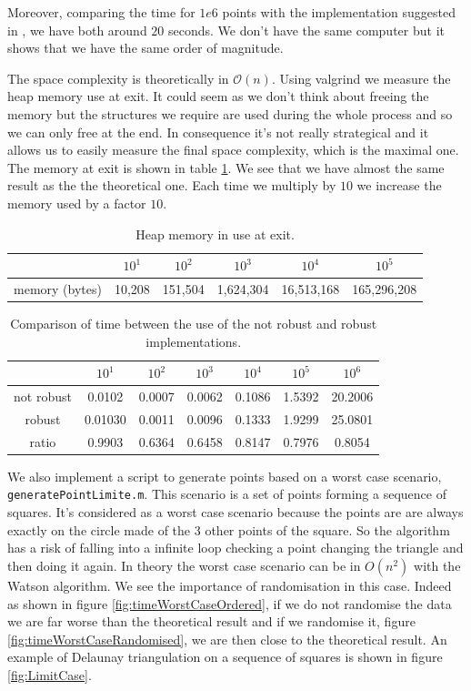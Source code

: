 Moreover, comparing the time for $1e6$ points with the implementation suggested in \cite{triangle}, we have both around $20$ seconds. We don't have the same computer but it shows that we have the same order of magnitude.

The space complexity is theoretically in $\mathcal{O}(n)$. Using valgrind we measure the heap memory use at exit. It could seem as we don't think about freeing the memory but the structures we require are used during the whole process and so we can only free at the end. In consequence it's not really strategical and it allows us to easily measure the final space complexity, which is the maximal one. The memory at exit is shown in table \ref{tab:memory}. We see that we have almost the same result as the the theoretical one. Each time we multiply by $10$ we increase the memory used by a factor $10$.

\begin{table}
\centering
\begin{tabular}{c|ccccc}
				& $10^1$ & $10^2$ 	  & $10^3$	 & $10^4$	& $10^5$ \\
				\hline
memory (bytes) & 10,208 & 151,504 & 1,624,304 & 16,513,168 &  165,296,208 \\
\end{tabular}
\caption{Heap memory in use at exit.}
\label{tab:memory}
\end{table}

\begin{table}
\centering
\begin{tabular}{c|cccccc}
	 & $10^1$ & $10^2$ 	 & $10^3$ 	& $10^4$ 	& $10^5$ & $10^6$ \\
	 \hline
not robust &0.0102 & 0.0007 &	0.0062 & 0.1086 &	1.5392 &	20.2006 \\
 robust & 0.01030 &	0.0011 &	0.0096 & 0.1333 &	1.9299 &	25.0801 \\	 
ratio & 0.9903 &  0.6364  &  0.6458   & 0.8147  &  0.7976  &  0.8054\\
\end{tabular}
\caption{Comparison of time between the use of the not robust and robust implementations. }
\label{tab:proportion}
\end{table}

We also implement a script to generate points based on a worst case scenario, \texttt{generatePointLimite.m}. This scenario is a set of points forming a sequence of squares. It's considered as a worst case scenario because the points are are always exactly on the circle made of the $3$ other points of the square. So the algorithm has a risk of falling into a infinite loop checking a point changing the triangle and then doing it again. In theory the worst case scenario can be in $O(n^2)$ with the Watson algorithm. We see the importance of randomisation in this case. Indeed as shown in figure \ref{fig:timeWorstCaseOrdered}, if we do not randomise the data we are far worse than the theoretical result and if we randomise it, figure \ref{fig:timeWorstCaseRandomised}, we are then close to the theoretical result.  An example of Delaunay triangulation on a sequence of squares is shown in figure \ref{fig:LimitCase}.

